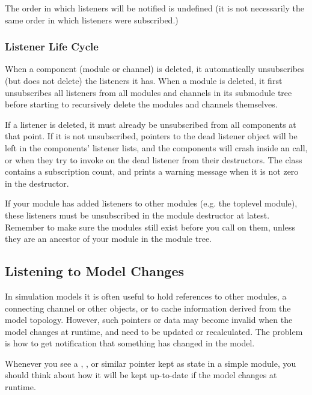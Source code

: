 The order in which listeners will be notified is undefined (it is not necessarily
the same order in which listeners were subscribed.)

\subsubsection{Listener Life Cycle}
\label{sec:simple-modules:signals:life-cycle}

When a component (module or channel) is deleted, it automatically
unsubscribes (but does not delete) the listeners it has. When a
module is deleted, it first unsubscribes all listeners from all
modules and channels in its submodule tree before starting
to recursively delete the modules and channels themselves.

If a listener is deleted, it must already be unsubscribed from all
components at that point. If it is not unsubscribed, pointers to the dead
listener object will be left in the components' listener lists, and the
components will crash inside an  call, or when they
try to invoke  on the dead listener from their
destructors. The  class contains a subscription count,
and prints a warning message when it is not zero in the destructor.

\begin{note}
  If your module has added listeners to other modules (e.g. the toplevel
  module), these listeners must be unsubscribed in the module
  destructor at latest. Remember to make sure the modules still exist before you
  call  on them, unless they are an ancestor
  of your module in the module tree.
\end{note}


\subsection{Listening to Model Changes}
\label{sec:ch-simple-modules:model-change}

In simulation models it is often useful to hold references to other
modules, a connecting channel or other objects, or to cache information
derived from the model topology. However, such pointers or data may
become invalid when the model changes at runtime, and need to be updated
or recalculated. The problem is how to get notification that something has
changed in the model.

\begin{note}
  Whenever you see a , ,  or
  similar pointer kept as state in a simple module, you should think about
  how it will be kept up-to-date if the model changes at runtime.
\end{note}


